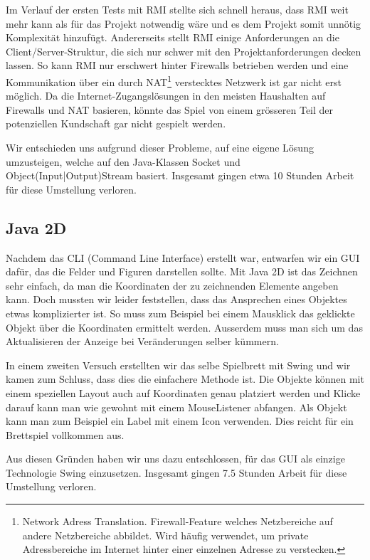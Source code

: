 \documentclass[12pt,halfparskip]{scrartcl}
\begin{document}
Im Verlauf der ersten Tests mit RMI stellte sich schnell heraus, dass RMI weit mehr kann als für das Projekt notwendig wäre und es dem Projekt somit unnötig Komplexität hinzufügt. Andererseits stellt RMI  einige Anforderungen an die Client/Server-Struktur, die sich nur schwer mit den Projektanforderungen decken lassen. So kann RMI nur erschwert hinter Firewalls betrieben werden und eine Kommunikation über ein durch NAT\footnote{Network Adress Translation. Firewall-Feature welches Netzbereiche auf andere Netzbereiche abbildet. Wird häufig verwendet, um private Adressbereiche im Internet hinter einer einzelnen Adresse zu verstecken.} verstecktes Netzwerk ist gar nicht erst möglich. Da die Internet-Zugangslösungen in den meisten Haushalten auf Firewalls und NAT basieren, könnte das Spiel von einem grösseren Teil der potenziellen Kundschaft gar nicht gespielt werden.

Wir entschieden uns aufgrund dieser Probleme, auf eine eigene Lösung umzusteigen, welche auf den Java-Klassen Socket und Object(Input|Output)Stream basiert. Insgesamt gingen etwa 10 Stunden Arbeit für diese Umstellung verloren.

\subsection{Java 2D}
\label{java_2d}

Nachdem das CLI (Command Line Interface) erstellt war, entwarfen wir ein GUI dafür, das die Felder und Figuren darstellen sollte. Mit Java 2D ist das Zeichnen sehr einfach, da man die Koordinaten der zu zeichnenden Elemente angeben kann. Doch mussten wir leider feststellen, dass das Ansprechen eines Objektes etwas komplizierter ist. So muss zum Beispiel bei einem Mausklick das geklickte Objekt über die Koordinaten ermittelt werden. Ausserdem muss man sich um das Aktualisieren der Anzeige bei Veränderungen selber kümmern.

In einem zweiten Versuch erstellten wir das selbe Spielbrett mit Swing und wir kamen zum Schluss, dass dies die einfachere Methode ist. Die Objekte können mit einem speziellen Layout auch auf Koordinaten genau platziert werden und Klicke darauf kann man wie gewohnt mit einem MouseListener abfangen. Als Objekt kann man zum Beispiel ein Label mit einem Icon verwenden. Dies reicht für ein Brettspiel vollkommen aus.

Aus diesen Gründen haben wir uns dazu entschlossen, für das GUI als einzige Technologie Swing einzusetzen. Insgesamt gingen 7.5 Stunden Arbeit für diese Umstellung verloren.
\end{document}
